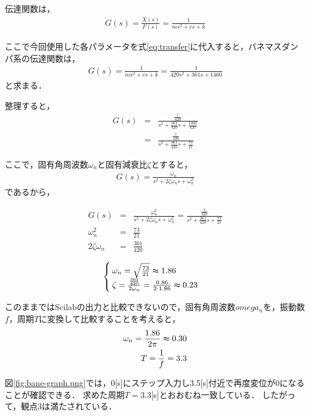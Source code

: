 \documentclass[dvipdfmx,titlepage,a4j]{jsarticle}  %
\begin{document}
伝達関数は，
\begin{eqnarray}
  G(s) = \frac{X(s)}{F(s)} = \frac{1}{m s^2 + c s + k} \label{eq:transfer}
\end{eqnarray}

ここで今回使用した各パラメータを式\ref{eq:transfer}に代入すると，バネマスダンパ系の伝達関数は，
\begin{eqnarray}
  G(s) = \frac{1}{m s^2 + c s + k} = \frac{1}{420 s^2 + 361 s + 1460} \nonumber
\end{eqnarray}
と求まる．

整理すると，
\begin{eqnarray}
  G(s) &=& \frac{\frac{1}{420}}{s^2 + \frac{361}{420} s + \frac{1460}{420}} \nonumber\\
  &=& \frac{\frac{1}{420}}{s^2 + \frac{361}{420} s + \frac{73}{21}}
\end{eqnarray}

ここで，固有角周波数$\omega_n$と固有減衰比$\zeta$とすると，
\begin{eqnarray}
  G(s) = \frac{\omega_n}{s^2 + 2 \zeta \omega_n s + \omega_n^2} \nonumber
\end{eqnarray}
であるから，

\begin{eqnarray}
  G(s) &=& \frac{\omega_n^2}{s^2 + 2 \zeta \omega_n s + \omega_n^2} =  \frac{\frac{1}{420}}{s^2 + \frac{361}{420} s + \frac{73}{21}} \nonumber \\
  \omega_n^2 &=&  \frac{73}{21} \nonumber\\
  2 \zeta \omega_n &=&  \frac{361}{420} \nonumber
\end{eqnarray}

\begin{eqnarray}
  \begin{cases}
    \omega_n = \sqrt{\frac{73}{21}} \thickapprox 1.86 \\
    \zeta = \frac{\frac{361}{420}}{2 \omega_n} = \frac{0.86}{2 \cdot 1.86} \thickapprox 0.23 \label{eq:zeta}
  \end{cases}
\end{eqnarray}

このままではScilabの出力と比較できないので，固有角周波数$omega_n$を，振動数$f$，周期$T$に変換して比較することを考えると，
\begin{eqnarray}
  \omega_n = \frac{1.86}{2 \pi} \thickapprox 0.30 \nonumber \\
  T = \frac{1}{f} = 3.3
\end{eqnarray}

図\ref{fig:bane-graph.png}では，0[s]にステップ入力し3.5[s]付近で再度変位が0になることが確認できる．
求めた周期$T = 3.3$[s]とおおむね一致している．
したがって，観点3は満たされている．
\end{document}
